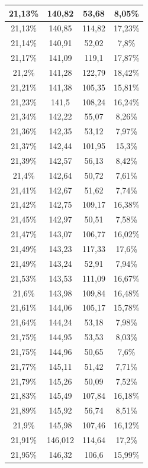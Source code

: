 \begin{center}
\begin{longtable}{|c|c|c|c|}
21,13\% & 140,82 & 53,68 & 8,05\%  \\ \hline
21,13\% & 140,85 & 114,82 & 17,23\%  \\ \hline
21,14\% & 140,91 & 52,02 & 7,8\%  \\ \hline
21,17\% & 141,09 & 119,1 & 17,87\%  \\ \hline
21,2\% & 141,28 & 122,79 & 18,42\%  \\ \hline
21,21\% & 141,38 & 105,35 & 15,81\%  \\ \hline
21,23\% & 141,5 & 108,24 & 16,24\%  \\ \hline
21,34\% & 142,22 & 55,07 & 8,26\%  \\ \hline
21,36\% & 142,35 & 53,12 & 7,97\%  \\ \hline
21,37\% & 142,44 & 101,95 & 15,3\%  \\ \hline
21,39\% & 142,57 & 56,13 & 8,42\%  \\ \hline
21,4\% & 142,64 & 50,72 & 7,61\%  \\ \hline
21,41\% & 142,67 & 51,62 & 7,74\%  \\ \hline
21,42\% & 142,75 & 109,17 & 16,38\%  \\ \hline
21,45\% & 142,97 & 50,51 & 7,58\%  \\ \hline
21,47\% & 143,07 & 106,77 & 16,02\%  \\ \hline
21,49\% & 143,23 & 117,33 & 17,6\%  \\ \hline
21,49\% & 143,24 & 52,91 & 7,94\%  \\ \hline
21,53\% & 143,53 & 111,09 & 16,67\%  \\ \hline
21,6\% & 143,98 & 109,84 & 16,48\%  \\ \hline
21,61\% & 144,06 & 105,17 & 15,78\%  \\ \hline
21,64\% & 144,24 & 53,18 & 7,98\%  \\ \hline
21,75\% & 144,95 & 53,53 & 8,03\%  \\ \hline
21,75\% & 144,96 & 50,65 & 7,6\%  \\ \hline
21,77\% & 145,11 & 51,42 & 7,71\%  \\ \hline
21,79\% & 145,26 & 50,09 & 7,52\%  \\ \hline
21,83\% & 145,49 & 107,84 & 16,18\%  \\ \hline
21,89\% & 145,92 & 56,74 & 8,51\%  \\ \hline
21,9\% & 145,98 & 107,46 & 16,12\%  \\ \hline
21,91\% & 146,012 & 114,64 & 17,2\%  \\ \hline
21,95\% & 146,32 & 106,6 & 15,99\%  \\ \hline

\end{longtable}
\end{center}
